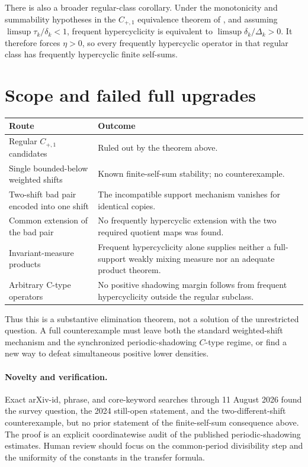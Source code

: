 \documentclass[11pt]{article}
\begin{document}
There is also a broader regular-class corollary.  Under the monotonicity and
summability hypotheses in the \(C_{+,1}\) equivalence theorem of \cite{gmm},
and assuming
\(\limsup\tau_k/\delta_k<1\), frequent hypercyclicity is equivalent to
\(\limsup\delta_k/\Delta_k>0\).  It therefore forces \(\eta>0\), so every
frequently hypercyclic operator in that regular class has frequently
hypercyclic finite self-sums.

\section*{Scope and failed full upgrades}
\begin{center}
\small
\begin{tabularx}{\textwidth}{@{}p{}X@{}}
\toprule
Route & Outcome \\
\midrule
Regular \(C_{+,1}\) candidates & Ruled out by the theorem above. \\
Single bounded-below weighted shifts & Known finite-self-sum stability; no counterexample. \\
Two-shift bad pair encoded into one shift & The incompatible support mechanism vanishes for identical copies. \\
Common extension of the bad pair & No frequently hypercyclic extension with the two required quotient maps was found. \\
Invariant-measure products & Frequent hypercyclicity alone supplies neither a full-support weakly mixing measure nor an adequate product theorem. \\
Arbitrary C-type operators & No positive shadowing margin follows from frequent hypercyclicity outside the regular subclass. \\
\bottomrule
\end{tabularx}
\end{center}

Thus this is a substantive elimination theorem, not a solution of the
unrestricted question.  A full counterexample must leave both the standard
weighted-shift mechanism and the synchronized periodic-shadowing \(C\)-type
regime, or find a new way to defeat simultaneous positive lower densities.

\paragraph{Novelty and verification.}
Exact arXiv-id, phrase, and core-keyword searches through 11 August 2026 found
the survey question, the 2024 still-open statement, and the two-different-shift
counterexample, but no prior statement of the finite-self-sum consequence
above.  The proof is an explicit coordinatewise audit of the published
periodic-shadowing estimates.  Human review should focus on the common-period
divisibility step and the uniformity of the constants in the transfer formula.
\end{document}
